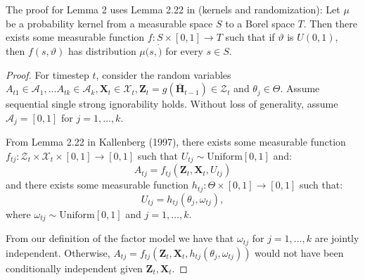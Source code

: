 \documentclass{article}
\newcommand{\vc}[1]{\mathbf{#1}}
\newcommand{\cl}[1]{\mathcal{#1}}
\newcommand{\hist}[1]{\bar{\vc{#1}}}
\begin{document}
	The proof for Lemma 2 uses Lemma 2.22 in \citet{kallenberg2006foundations} (kernels and randomization): Let $\mu$ be a probability kernel from a measurable space $S$ to a Borel space $T$. Then there exists some measurable function $f: S \times [0, 1] \rightarrow T$ such that if $\vartheta$ is $U(0, 1)$, then $f(s, \vartheta)$ has distribution $\mu(s, \dot)$ for every $s\in S$. 
	\begin{proof}
	For timestep $t$, consider the random variables $A_{t1} \in \cl{A}_1, \dots A_{tk}\in \cl{A}_k, \vc{X}_t\in \cl{X}_t, \vc{Z}_t = g(\hist{H}_{t-1}) \in \cl{Z}_t$ and $\theta_j \in \Theta$. Assume sequential single strong ignorability holds.
	Without loss of generality, assume $\cl{A}_j = [0, 1]$ for $j=1, \dots, k$. 
	
	From Lemma 2.22 in Kallenberg (1997), there exists some measurable function $f_{tj}: \cl{Z}_t \times \cl{X}_t \times [0, 1] \rightarrow [0, 1]$ such that $U_{tj} \sim \text{Uniform}[0, 1]$ and:
	\begin{equation}
	A_{tj} = f_{tj} (\vc{Z}_t, \vc{X}_t, U_{tj})
	\end{equation}
	and there exists some measurable function $h_{tj}: \Theta \times [0, 1] \rightarrow [0, 1]$ such that: 
	\begin{equation}
	U_{tj} = h_{tj}(\theta_j, \omega_{tj}),
	\end{equation}
	where $\omega_{tj} \sim \text{Uniform}[0, 1]$ and $j=1, \dots, k$. 
	
	From our definition of the factor model we have that $\omega_{tj}$ for  $j=1, \dots, k$ are jointly independent. Otherwise, $A_{tj} = f_{tj} (\vc{Z}_t, \vc{X}_t, h_{tj}(\theta_j, \omega_{tj}))$ would not have been conditionally independent given $\vc{Z}_t, \vc{X}_t$. 
	

\end{proof}
\end{document}
